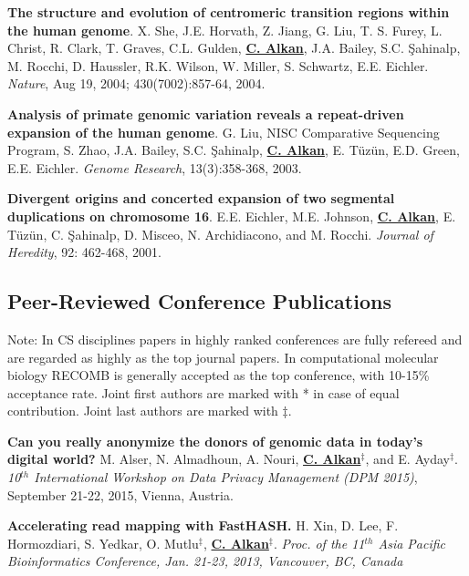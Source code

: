 \documentclass[margin,line]{res}
\begin{document}
\begin{resume}
\vspace{-.2cm}
  {\bf The structure and evolution of centromeric transition regions within
    the human genome}.
  X. She, J.E. Horvath, Z. Jiang, G. Liu, T. S. Furey,
  L. Christ, R. Clark, T. Graves, C.L. Gulden, {\bf \underline{C. Alkan}}, J.A. Bailey, S.C. \c{S}ahinalp, 
  M. Rocchi, D. Haussler, R.K. Wilson, W. Miller, S. Schwartz, E.E. Eichler.
  {\em Nature}, Aug 19, 2004; 430(7002):857-64, 2004.


\vspace{-.2cm}
  {\bf Analysis of primate genomic variation reveals a repeat-driven 
    expansion of the human genome}.
  G. Liu, NISC Comparative Sequencing Program, S. Zhao, J.A. Bailey, 
  S.C. \c{S}ahinalp, {\bf \underline{C. Alkan}}, E. T\"{u}z\"{u}n, E.D. Green, E.E. Eichler.
  {\em Genome Research}, 13(3):358-368, 2003.

\vspace{-.2cm}
  {\bf Divergent origins and concerted expansion of two segmental
    duplications on 
    chromosome 16}.
  E.E. Eichler, M.E. Johnson, {\bf \underline{C. Alkan}}, E. T\"{u}z\"{u}n, C. \c{S}ahinalp,
    D. Misceo, 
    N. Archidiacono, and M. Rocchi.
    {\em Journal of Heredity}, 92: 462-468, 2001.

\vspace{-.4cm}
\subsection{\small \sc  Peer-Reviewed Conference Publications}
\vspace{-.4cm}
{\small Note: In CS disciplines papers in highly ranked conferences are fully refereed 
and are regarded as highly as the top journal papers. 
In computational molecular biology RECOMB is generally accepted as the 
top conference, with 10-15\% acceptance rate.
Joint first authors are marked with * in case of equal contribution.
Joint last authors are marked with $\ddag$.
}

\vspace{-.2cm}
{\bf Can you really anonymize the donors of genomic data in today's digital world?}
M. Alser, N. Almadhoun, A. Nouri, {\bf {\underline{C. Alkan}}}$^\ddag$, and E. Ayday$^\ddag$. 
{\em 10$^{th}$ International Workshop on Data Privacy Management (DPM 2015)}, 
 September 21-22, 2015, Vienna, Austria.


\vspace{-.2cm}
{\bf Accelerating read mapping with FastHASH.}
H. Xin, D. Lee, F. Hormozdiari, S. Yedkar, O. Mutlu$^\ddag$, {\bf {\underline {C. Alkan}}}$^\ddag$.
{\em  Proc. of the 11$^{th}$  Asia Pacific Bioinformatics Conference,
Jan. 21-23, 2013, Vancouver, BC, Canada}


\end{resume}
\end{document}
